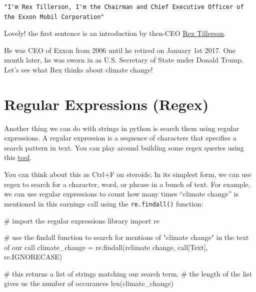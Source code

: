 \documentclass[
  letterpaper,
  DIV=11,
  numbers=noendperiod]{scrreprt}
\newenvironment{Shaded}{\begin{snugshade}}{\end{snugshade}}
\newcommand{\BuiltInTok}[1]{\textcolor[rgb]{0.00,0.23,0.31}{#1}}
\newcommand{\CommentTok}[1]{\textcolor[rgb]{0.37,0.37,0.37}{#1}}
\newcommand{\ImportTok}[1]{\textcolor[rgb]{0.00,0.46,0.62}{#1}}
\newcommand{\NormalTok}[1]{\textcolor[rgb]{0.00,0.23,0.31}{#1}}
\newcommand{\OperatorTok}[1]{\textcolor[rgb]{0.37,0.37,0.37}{#1}}
\newcommand{\StringTok}[1]{\textcolor[rgb]{0.13,0.47,0.30}{#1}}
\newcommand{\VerbatimStringTok}[1]{\textcolor[rgb]{0.13,0.47,0.30}{#1}}
\begin{document}
\begin{verbatim}
"I'm Rex Tillerson, I'm the Chairman and Chief Executive Officer of the Exxon Mobil Corporation"
\end{verbatim}

Lovely! the first sentence is an introduction by then-CEO
\href{https://en.wikipedia.org/wiki/Rex_Tillerson}{Rex Tillerson}.

He was CEO of Exxon from 2006 until he retired on January 1st 2017. One
month later, he was sworn in as U.S. Secretary of State under Donald
Trump. Let's see what Rex thinks about climate change!

\hypertarget{regular-expressions-regex}{%
\section{Regular Expressions (Regex)}\label{regular-expressions-regex}}

Another thing we can do with strings in python is search them using
regular expressions. A regular expression is a sequence of characters
that specifies a search pattern in text. You can play around building
some regex queries using this \href{https://regexr.com/}{tool}.

You can think about this as Ctrl+F on steroids; In its simplest form, we
can use regex to search for a character, word, or phrase in a bunch of
text. For example, we can use regular expressions to count how many
times ``climate change'' is mentioned in this earnings call using the
\texttt{re.findall()} function:

\begin{Shaded}
\begin{Highlighting}[]
\CommentTok{\# import the regular expressions library }
\ImportTok{import}\NormalTok{ re}

\CommentTok{\# use the findall function to search for mentions of "climate change" in the text of our call}
\NormalTok{climate\_change }\OperatorTok{=}\NormalTok{ re.findall(}\VerbatimStringTok{r\textquotesingle{}climate change\textquotesingle{}}\NormalTok{, call[}\StringTok{\textquotesingle{}Text\textquotesingle{}}\NormalTok{], re.IGNORECASE)}

\CommentTok{\# this returns a list of strings matching our search term. }
\CommentTok{\# the length of the list gives us the number of occurances}
\BuiltInTok{len}\NormalTok{(climate\_change)}
\end{Highlighting}
\end{Shaded}
\end{document}
